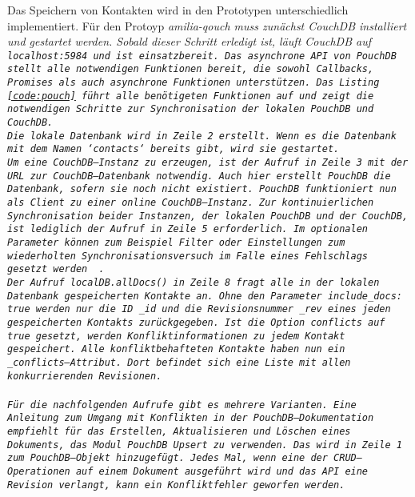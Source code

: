 Das Speichern von Kontakten wird in den Prototypen unterschiedlich implementiert.
%
%
Für den Protoyp \it{amilia-qouch} muss zunächst CouchDB installiert und gestartet werden.
Sobald dieser Schritt erledigt ist, läuft CouchDB auf \tt{localhost:5984} und ist einsatzbereit.
Das asynchrone \gls{API} von PouchDB stellt alle notwendigen Funktionen bereit, die sowohl Callbacks, Promises als auch asynchrone Funktionen unterstützen. 
Das Listing \ref{code:pouch} führt alle benötigeten Funktionen auf und zeigt die notwendigen Schritte zur Synchronisation der lokalen PouchDB und CouchDB.\\
Die lokale Datenbank wird in Zeile 2 erstellt. Wenn es die Datenbank mit dem Namen `contacts` bereits gibt, wird sie gestartet.\\
%
Um eine CouchDB--Instanz zu erzeugen, ist der Aufruf in Zeile 3 mit der URL zur CouchDB--Datenbank notwendig. Auch hier erstellt PouchDB die Datenbank, sofern sie noch nicht existiert. PouchDB funktioniert nun als Client zu einer online CouchDB--Instanz.
Zur kontinuierlichen Synchronisation beider Instanzen, der lokalen PouchDB und der CouchDB, ist lediglich der Aufruf in Zeile 5 erforderlich. Im optionalen Parameter können zum Beispiel Filter oder Einstellungen zum wiederholten Synchronisationsversuch im Falle eines Fehlschlags gesetzt werden ~\cite{pouch_options}.\\
Der Aufruf \tt{localDB.allDocs()} in Zeile 8 fragt alle in der lokalen Datenbank gespeicherten Kontakte an.
Ohne den Parameter \tt{include\_docs: true} werden nur die ID \tt{\_id} und die Revisionsnummer \tt{\_rev} eines jeden gespeicherten Kontakts zurückgegeben.
Ist die Option \tt{conflicts} auf \tt{true} gesetzt, werden Konfliktinformationen zu jedem Kontakt gespeichert.
Alle konfliktbehafteten Kontakte haben nun ein \tt{\_conflicts}--Attribut.
Dort befindet sich eine Liste mit allen konkurrierenden Revisionen.\\\\
%
Für die nachfolgenden Aufrufe gibt es mehrere Varianten.
Eine Anleitung zum Umgang mit Konflikten in der PouchDB--Dokumentation empfiehlt für das Erstellen, Aktualisieren und Löschen eines Dokuments, das Modul PouchDB Upsert zu verwenden.
Das wird in Zeile 1 zum PouchDB--Objekt hinzugefügt.
Jedes Mal, wenn eine der \gls{CRUD}--Operationen auf einem Dokument ausgeführt wird und das \gls{API} eine Revision verlangt, kann ein Konfliktfehler geworfen werden.
